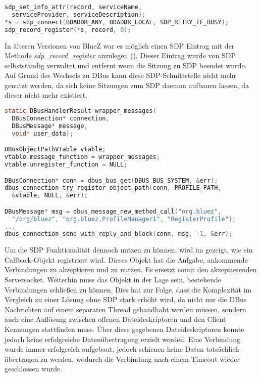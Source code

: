         \begin{lstlisting}[frame=bt, label={lst:bluetooth:sdp}, language=C, caption=Veraltete Nutzung von SDP (Servercode in C)]
sdp_set_info_attr(record, serviceName,
  serviceProvider, serviceDescription);
*s = sdp_connect(BDADDR_ANY, BDADDR_LOCAL, SDP_RETRY_IF_BUSY);
sdp_record_register(*s, record, 0);
        \end{lstlisting}
        In älteren Versionen von BlueZ war es möglich einen SDP Eintrag mit der Methode {\it sdp\_record\_register} anzulegen (). Dieser Eintrag wurde von SDP selbstständig verwaltet und entfernt wenn die Sitzung zu SDP beendet wurde. Auf Grund des Wechsels zu DBus kann diese SDP-Schnittstelle nicht mehr genutzt werden, da sich keine Sitzungen zum SDP daemon aufbauen lassen, da dieser nicht mehr existiert.
        \begin{lstlisting}[frame=bt, label={lst:bluetooth:dbus}, language=C, caption=DBus Nutzung von SDP (Servercode in C)]
static DBusHandlerResult wrapper_messages(
  DBusConnection* connection,
  DBusMessage* message,
  void* user_data);

DBusObjectPathVTable vtable;
vtable.message_function = wrapper_messages;
vtable.unregister_function = NULL;              

DBusConnection* conn = dbus_bus_get(DBUS_BUS_SYSTEM, &err);
dbus_connection_try_register_object_path(conn, PROFILE_PATH,
  &vtable, NULL, &err);

DBusMessage* msg = dbus_message_new_method_call("org.bluez",
  "/org/bluez", "org.bluez.ProfileManager1", "RegisterProfile");
...
dbus_connection_send_with_reply_and_block(conn, msg, -1, &err);
        \end{lstlisting}
        Um die SDP Funktionalität dennoch nutzen zu können, wird im  gezeigt, wie ein Callback-Objekt registriert wird. Dieses Objekt hat die Aufgabe, ankommende Verbindungen zu akzeptieren und zu nutzen. Es ersetzt somit den akzeptierenden Serversocket. Weiterhin muss das Objekt in der Lage sein, bestehende Verbindungen schließen zu können. Dies hat zur Folge, dass die Komplexität im Vergleich zu einer Lösung ohne SDP stark erhöht wird, da nicht nur die DBus Nachrichten auf einem separaten Thread gehandhabt werden müssen, sondern auch eine Auflösung zwischen offenen Dateideskriptoren und den Client Kennungen stattfinden muss.
        Über diese gegebenen Dateideskriptoren konnte jedoch keine erfolgreiche Datenübertragung erzielt werden. Eine Verbindung wurde immer erfolgreich aufgebaut, jedoch schienen keine Daten tatsächlich übertragen zu werden, wodurch die Verbindung nach einem Timeout wieder geschlossen wurde.
        
